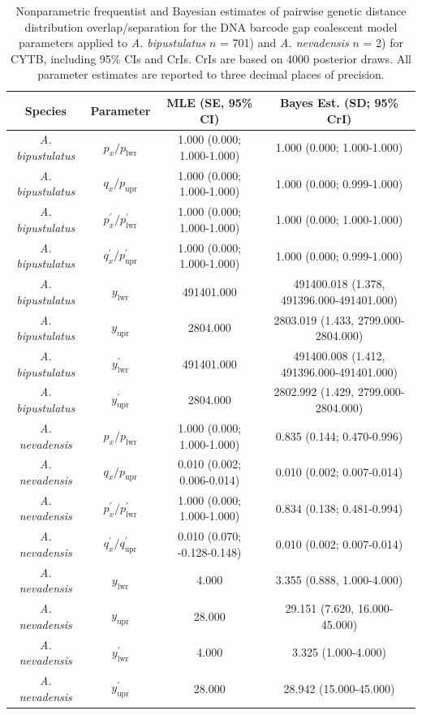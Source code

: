\documentclass[12pt]{article}
\begin{document}
\begin{landscape}
\begin{table}[H]

\centering

\caption{Nonparametric frequentist and Bayesian estimates of pairwise genetic distance distribution overlap/separation for the DNA barcode gap coalescent model parameters applied to \textit{A. bipustulatus} $n$ = 701) and \textit{A. nevadensis} $n$ = 2) for CYTB, including 95\%  CIs and CrIs. CrIs are based on 4000 posterior draws. All parameter estimates are reported to three decimal places of precision.}

\begin{tabular}{cccc} \hline

\textbf{Species} & \textbf{Parameter} & \textbf{MLE (SE, 95\% CI)} & \textbf{Bayes Est. (SD; 95\% CrI)} \\  \hline
\textit{A. bipustulatus} & $p_x/p_\mathrm{lwr}$ & 1.000 (0.000; 1.000-1.000) & 1.000 (0.000; 1.000-1.000) \\
\textit{A. bipustulatus} & $q_x/p_\mathrm{upr}$ & 1.000 (0.000; 1.000-1.000) & 1.000 (0.000; 0.999-1.000) \\
\textit{A. bipustulatus} & $p^{'}_x/p^{'}_\mathrm{lwr}$ & 1.000 (0.000; 1.000-1.000) & 1.000 (0.000; 1.000-1.000)  \\
\textit{A. bipustulatus} & $q^{'}_x/p^{'}_\mathrm{upr}$ & 1.000 (0.000; 1.000-1.000) & 1.000 (0.000; 0.999-1.000) \\
\textit{A. bipustulatus} & $y_\mathrm{lwr}$ & 491401.000 & 491400.018 (1.378, 491396.000-491401.000) \\
\textit{A. bipustulatus} & $y_\mathrm{upr}$ & 2804.000 & 2803.019 (1.433, 2799.000-2804.000) \\
\textit{A. bipustulatus} & $y^{'}_\mathrm{lwr}$ & 491401.000 & 491400.008 (1.412, 491396.000-491401.000) \\
\textit{A. bipustulatus} & $y^{'}_\mathrm{upr}$ & 2804.000 & 2802.992 (1.429, 2799.000-2804.000) \\


\textit{A. nevadensis} & $p_x/p_\mathrm{lwr}$ & 1.000 (0.000; 1.000-1.000) & 0.835 (0.144; 0.470-0.996) \\
\textit{A. nevadensis} & $q_x/p_\mathrm{upr}$ & 0.010 (0.002; 0.006-0.014) & 0.010 (0.002; 0.007-0.014) \\
\textit{A. nevadensis} &  $p^{'}_x/p^{'}_\mathrm{lwr}$ & 1.000 (0.000; 1.000-1.000) & 0.834 (0.138; 0.481-0.994) \\
\textit{A. nevadensis} &  $q^{'}_x/q^{'}_\mathrm{upr}$ & 0.010 (0.070; -0.128-0.148) & 0.010 (0.002; 0.007-0.014) \\
\textit{A. nevadensis} & $y_\mathrm{lwr}$ & 4.000 & 3.355 (0.888, 1.000-4.000) \\
\textit{A. nevadensis} & $y_\mathrm{upr}$ & 28.000  & 29.151 (7.620, 16.000-45.000) \\
\textit{A. nevadensis} & $y^{'}_\mathrm{lwr}$ & 4.000 & 3.325 (1.000-4.000) \\
\textit{A. nevadensis} & $y^{'}_\mathrm{upr}$ & 28.000  & 28.942 (15.000-45.000)  \\




\end{tabular}
\end{table}
\end{landscape}
\end{document}
